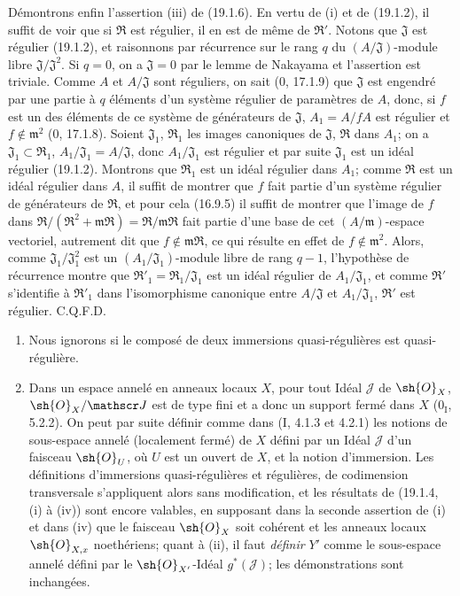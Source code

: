 Démontrons enfin l'assertion (iii) de (19.1.6). En vertu de (i) et de (19.1.2), il suffit de voir que si $\mathfrak R$ est régulier, il en est de même de $\mathfrak R'$. Notons que $\mathfrak J$ est régulier (19.1.2), et raisonnons par récurrence sur le rang $q$ du $(A/\mathfrak J)$-module libre $\mathfrak J/\mathfrak J^2$. Si $q=0$, on a $\mathfrak J=0$ par le lemme de Nakayama et l'assertion est triviale. Comme $A$ et $A/\mathfrak J$ sont réguliers, on sait ($0$, 17.1.9) que $\mathfrak J$ est engendré par une partie à $q$ éléments d'un système régulier de paramètres de $A$, donc, si $f$ est un des éléments de ce système de générateurs de $\mathfrak J$, $A_1=A/fA$ est régulier et $f\notin\mathfrak m^2$ ($0$, 17.1.8). Soient $\mathfrak J_1$, $\mathfrak R_1$ les images canoniques de $\mathfrak J$, $\mathfrak R$ dans $A_1$; on a $\mathfrak J_1\subset\mathfrak R_1$, $A_1/\mathfrak J_1=A/\mathfrak J$, donc $A_1/\mathfrak J_1$ est régulier et par suite $\mathfrak J_1$ est un idéal régulier (19.1.2). Montrons que $\mathfrak R_1$ est un idéal régulier dans $A_1$; comme $\mathfrak R$ est un idéal régulier dans $A$, il suffit de montrer que $f$ fait partie d'un système régulier de générateurs de $\mathfrak R$, et pour cela (16.9.5) il suffit de montrer que l'image de $f$ dans $\mathfrak R/(\mathfrak R^2+\mathfrak m\mathfrak R)=\mathfrak R/\mathfrak m\mathfrak R$ fait partie d'une base de cet $(A/\mathfrak m)$-espace vectoriel, autrement dit que $f\notin\mathfrak m\mathfrak R$, ce qui résulte en effet de $f\notin\mathfrak m^2$. Alors, comme $\mathfrak J_1/\mathfrak J_1^2$ est un $(A_1/\mathfrak J_1)$-module libre de rang $q-1$, l'hypothèse de récurrence montre que $\mathfrak R'_1=\mathfrak R_1/\mathfrak J_1$ est un idéal régulier de $A_1/\mathfrak J_1$, et comme $\mathfrak R'$ s'identifie à $\mathfrak R'_1$ dans l'isomorphisme canonique entre $A/\mathfrak J$ et $A_1/\mathfrak J_1$, $\mathfrak R'$ est régulier. C.Q.F.D.

\begin{remarks}[19.1.7]
\label{IV.19.1.7}
\begin{enumerate}
  \item[(i)] Nous ignorons si le composé de deux immersions quasi-régulières est quasi-régulière.
  \item[(ii)] Dans un espace annelé en anneaux locaux $X$, pour tout Idéal $\mathscr J$ de $\sh{O}_X$, $\sh{O}_X/\mathscr J$ est de type fini et a donc un support fermé dans $X$ ($0_{\mathrm I}$, 5.2.2). On peut par suite définir comme dans (I, 4.1.3 et 4.2.1) les notions de sous-espace annelé (localement fermé) de $X$ défini par un Idéal $\mathscr J$ d'un faisceau $\sh{O}_U$, où $U$ est un ouvert de $X$, et la notion d'immersion. Les définitions d'immersions quasi-régulières et régulières, de codimension transversale s'appliquent alors sans modification, et les résultats de (19.1.4, (i) à (iv)) sont encore valables, en supposant dans la seconde assertion de (i) et dans (iv) que le faisceau $\sh{O}_X$ soit cohérent et les anneaux locaux $\sh{O}_{X,x}$ noethériens; quant à (ii), il faut \emph{définir} $Y'$ comme le sous-espace annelé défini par le $\sh{O}_{X'}$-Idéal $g^*(\mathscr J)$; les démonstrations sont inchangées.
\end{enumerate}
\end{remarks}

